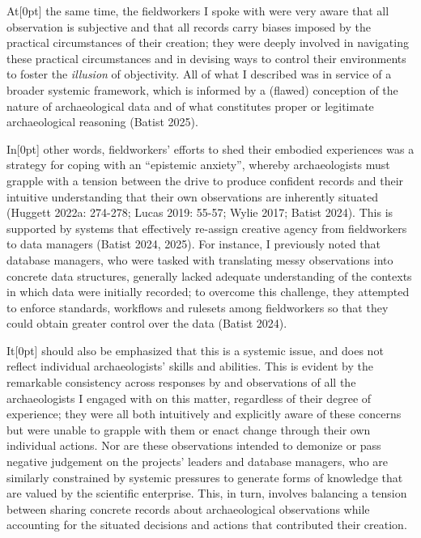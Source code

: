\documentclass[
]{article}
\newcommand{\paragraphnumber}[1]{\marginnote{\color{lightgray}\tiny{#1}}[0pt]}
\begin{document}
At\paragraphnumber{[36]} the same time, the fieldworkers I spoke with
were very aware that all observation is subjective and that all records
carry biases imposed by the practical circumstances of their creation;
they were deeply involved in navigating these practical circumstances
and in devising ways to control their environments to foster the
\emph{illusion} of objectivity. All of what I described was in service
of a broader systemic framework, which is informed by a (flawed)
conception of the nature of archaeological data and of what constitutes
proper or legitimate archaeological reasoning (Batist 2025).

In\paragraphnumber{[37]} other words, fieldworkers' efforts to shed
their embodied experiences was a strategy for coping with an ``epistemic
anxiety'', whereby archaeologists must grapple with a tension between
the drive to produce confident records and their intuitive understanding
that their own observations are inherently situated (Huggett 2022a:
274-278; Lucas 2019: 55-57; Wylie 2017; Batist 2024). This is supported
by systems that effectively re-assign creative agency from fieldworkers
to data managers (Batist 2024, 2025). For instance, I previously noted
that database managers, who were tasked with translating messy
observations into concrete data structures, generally lacked adequate
understanding of the contexts in which data were initially recorded; to
overcome this challenge, they attempted to enforce standards, workflows
and rulesets among fieldworkers so that they could obtain greater
control over the data (Batist 2024).

It\paragraphnumber{[38]} should also be emphasized that this is a
systemic issue, and does not reflect individual archaeologists' skills
and abilities. This is evident by the remarkable consistency across
responses by and observations of all the archaeologists I engaged with
on this matter, regardless of their degree of experience; they were all
both intuitively and explicitly aware of these concerns but were unable
to grapple with them or enact change through their own individual
actions. Nor are these observations intended to demonize or pass
negative judgement on the projects' leaders and database managers, who
are similarly constrained by systemic pressures to generate forms of
knowledge that are valued by the scientific enterprise. This, in turn,
involves balancing a tension between sharing concrete records about
archaeological observations while accounting for the situated decisions
and actions that contributed their creation.
\end{document}
